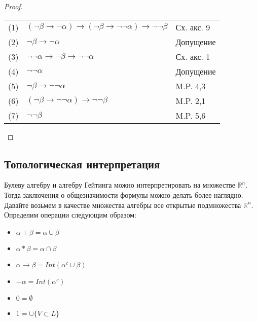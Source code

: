 \begin{proof}
\begin{enumerate}
\begin{itemize}
\begin{tabular}{lll}
(1) &$(\neg \beta \rightarrow \neg \alpha) \rightarrow (\neg \beta \rightarrow \neg \neg \alpha) \rightarrow \neg \neg \beta$& Сх. акс. 9\\
(2) &$\neg \beta \rightarrow \neg \alpha$& Допущение\\
(3) &$\neg \neg \alpha \rightarrow \neg \beta \rightarrow \neg \neg \alpha$& Сх. акс. 1\\
(4) &$\neg \neg \alpha$& Допущение\\
(5) &$\neg \beta \rightarrow \neg \neg \alpha$& M.P. 4,3\\
(6) &$(\neg \beta \rightarrow \neg \neg \alpha) \rightarrow \neg \neg \beta$& M.P. 2,1\\
(7) &$\neg \neg \beta$& M.P. 5,6\\
\end{tabular}
\end{itemize}
\end{enumerate}
\end{proof}
\subsection{Топологическая интерпретация}
\label{sec-5-9}
Булеву алгебру и алгебру Гейтинга можно интерпретировать на множестве $\mathbb R^n$. Тогда заключения о общезначимости формулы можно делать более наглядно. Давайте возьмем в качестве множества алгебры все открытые подмножества $\mathbb R^n$. Определим операции следующим образом:
\begin{itemize}
\item $\alpha + \beta = \alpha \cup \beta$
\item $\alpha * \beta = \alpha \cap \beta$
\item $\alpha \rightarrow \beta = Int(\alpha^c\cup\beta)$
\item $-\alpha = Int(\alpha^c)$
\item $0 = \emptyset$
\item $1 = \cup \lbrace V \subset L \rbrace$
\end{itemize}